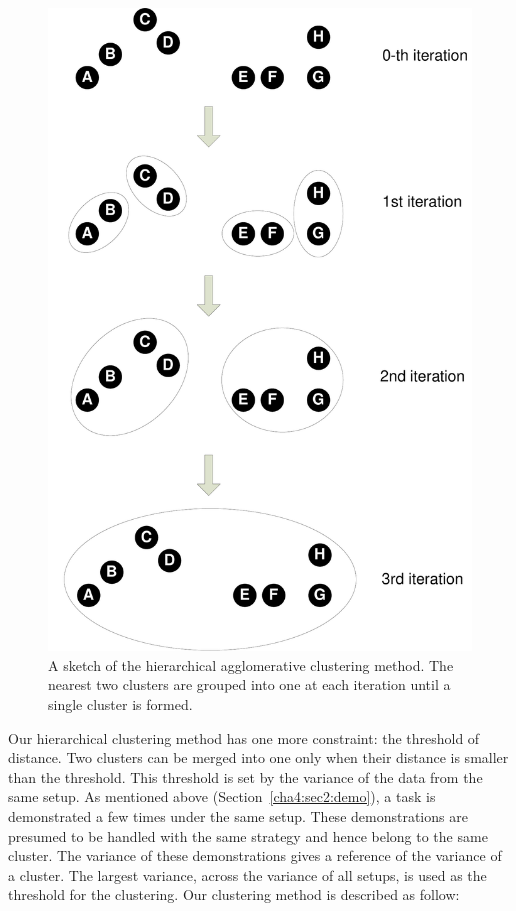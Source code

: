 \begin{figure}
  \centering
   \includegraphics[width=12cm]{./fig_cha4/hierarchicalclustering.pdf}
  \caption{   {A sketch of the hierarchical agglomerative clustering method. The nearest two clusters are grouped into one at each iteration until a single cluster is formed.}
}
\label{fig:hcluster}
\end{figure}

Our hierarchical clustering method has one more constraint: the threshold of distance. Two clusters can be merged into one only when their distance is smaller than the threshold. This threshold is set by the variance of the data from the same setup. As mentioned above (Section~\ref{cha4:sec2:demo}), a task is demonstrated a few times under the same setup. These demonstrations are presumed to be handled with the same strategy and hence belong to the same cluster. The variance of these demonstrations gives a reference of the variance of a cluster. The largest variance, across the variance of all setups, is used as the threshold for the clustering. Our clustering method is described as follow:

